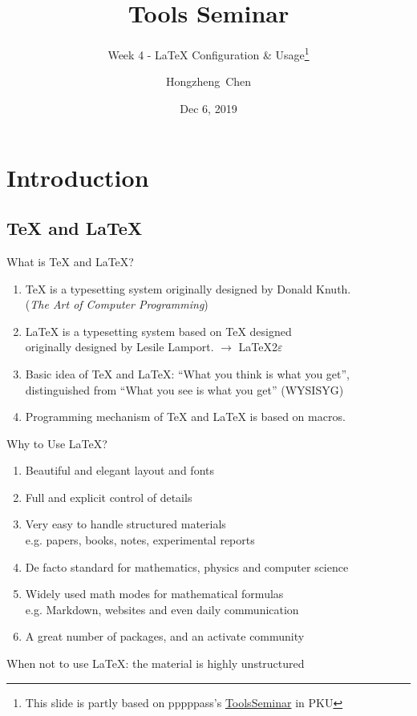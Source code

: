 \documentclass{../TexTemplate/myslide}
\title[ToolsSeminar]{Tools Seminar}
\subtitle{Week 4 - \LaTeX{} Configuration \& Usage\protect\footnote{This slide is partly based on pppppass's \href{https://github.com/pppppass/ToolsSeminar}{ToolsSeminar} in PKU}}
\author[chhzh123]{Hongzheng~Chen}
\date[Dec 6, 2019]{Dec 6, 2019}
\begin{document}
\begin{frame}
\titlepage
\end{frame}

\begin{frame}
\tableofcontents
\end{frame}

\section{Introduction}
\begin{frame}
\sectionpage
\end{frame}

\subsection{\TeX{} and \LaTeX}
\begin{frame}{What is \TeX{} and \LaTeX?}
\begin{enumerate}
\item \TeX{} is a typesetting system originally designed by Donald Knuth.\\
(\emph{The Art of Computer Programming})
\item \LaTeX{} is a typesetting system based on \TeX{} designed \\
originally designed by Lesile Lamport. $\to$ \LaTeX 2$\varepsilon$
\item Basic idea of \TeX{} and \LaTeX{}: ``What you think is what you get'', \\ distinguished from ``What you see is what you get'' (WYSISYG)
\item Programming mechanism of \TeX{} and \LaTeX{} is based on macros.
\end{enumerate}
\end{frame}

\begin{frame}{Why to Use \LaTeX?}
\begin{enumerate}[<+->]
\item Beautiful and elegant layout and fonts
\item Full and explicit control of details
\item Very easy to handle structured materials \\
e.g. papers, books, notes, experimental reports
\item De facto standard for mathematics, physics and computer science
\item Widely used math modes for mathematical formulas \\
e.g. Markdown, websites and even daily communication
\item A great number of packages, and an activate community
\end{enumerate}
\pause
When not to use \LaTeX{}: the material is highly unstructured
\end{frame}
\end{document}
